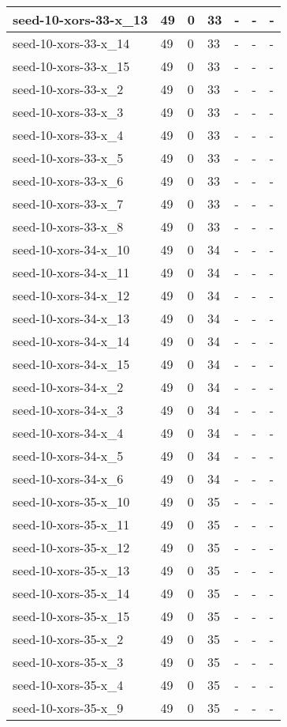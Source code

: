 \begin{scriptsize}
\begin{longtable}{|p{5cm}|l|l|l|l|l|l|}
seed-10-xors-33-x\_13&49&0&33&-&-&- \\ \hline 
seed-10-xors-33-x\_14&49&0&33&-&-&- \\ \hline 
seed-10-xors-33-x\_15&49&0&33&-&-&- \\ \hline 
seed-10-xors-33-x\_2&49&0&33&-&-&- \\ \hline 
seed-10-xors-33-x\_3&49&0&33&-&-&- \\ \hline 
seed-10-xors-33-x\_4&49&0&33&-&-&- \\ \hline 
seed-10-xors-33-x\_5&49&0&33&-&-&- \\ \hline 
seed-10-xors-33-x\_6&49&0&33&-&-&- \\ \hline 
seed-10-xors-33-x\_7&49&0&33&-&-&- \\ \hline 
seed-10-xors-33-x\_8&49&0&33&-&-&- \\ \hline 
seed-10-xors-34-x\_10&49&0&34&-&-&- \\ \hline 
seed-10-xors-34-x\_11&49&0&34&-&-&- \\ \hline 
seed-10-xors-34-x\_12&49&0&34&-&-&- \\ \hline 
seed-10-xors-34-x\_13&49&0&34&-&-&- \\ \hline 
seed-10-xors-34-x\_14&49&0&34&-&-&- \\ \hline 
seed-10-xors-34-x\_15&49&0&34&-&-&- \\ \hline 
seed-10-xors-34-x\_2&49&0&34&-&-&- \\ \hline 
seed-10-xors-34-x\_3&49&0&34&-&-&- \\ \hline 
seed-10-xors-34-x\_4&49&0&34&-&-&- \\ \hline 
seed-10-xors-34-x\_5&49&0&34&-&-&- \\ \hline 
seed-10-xors-34-x\_6&49&0&34&-&-&- \\ \hline 
seed-10-xors-35-x\_10&49&0&35&-&-&- \\ \hline 
seed-10-xors-35-x\_11&49&0&35&-&-&- \\ \hline 
seed-10-xors-35-x\_12&49&0&35&-&-&- \\ \hline 
seed-10-xors-35-x\_13&49&0&35&-&-&- \\ \hline 
seed-10-xors-35-x\_14&49&0&35&-&-&- \\ \hline 
seed-10-xors-35-x\_15&49&0&35&-&-&- \\ \hline 
seed-10-xors-35-x\_2&49&0&35&-&-&- \\ \hline 
seed-10-xors-35-x\_3&49&0&35&-&-&- \\ \hline 
seed-10-xors-35-x\_4&49&0&35&-&-&- \\ \hline 
seed-10-xors-35-x\_9&49&0&35&-&-&- \\ \hline 

\end{longtable}
\end{scriptsize}
